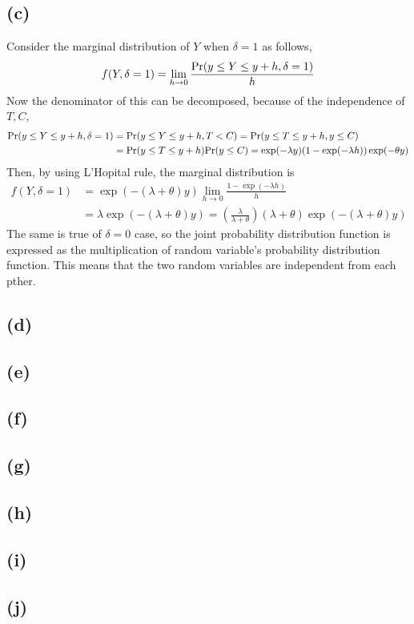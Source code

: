 \documentclass{article}
\begin{document}
\subsection{(c)}
Consider the marginal distribution of $Y$ when $\delta = 1$ as follows,
\begin{align*}
	f(Y, \delta = 1) = \lim_{h \to 0} \frac{{\rm Pr}(y \leq Y \leq y + h, \delta = 1)}{h}
\end{align*}
Now the denominator of this can be decomposed, because of the independence of $T, C$, 
\begin{align*}
	{\rm Pr}(y \leq Y \leq y + h, \delta = 1) &= {\rm Pr}(y \leq Y \leq y + h, T < C) = {\rm Pr}(y \leq T \leq y + h, y \leq C) \\
	&= {\rm Pr}(y \leq T \leq y + h) {\rm Pr}(y \leq C) = \exp(-\lambda y) (1 - \exp(-\lambda h)) \exp(-\theta y) \\
\end{align*}
Then, by using L'Hopital rule, the marginal distribution is 
\begin{align*}
	f(Y, \delta = 1) &= \exp(-(\lambda+\theta)y) \lim_{h \to 0} \frac{1 - \exp(-\lambda h)}{h}\\
	&= \lambda \exp(-(\lambda+\theta)y) = \left(\frac{\lambda}{\lambda+ \theta}\right) (\lambda+\theta)\exp(-(\lambda+\theta)y)
\end{align*}
The same is true of $\delta = 0$ case, so the joint probability distribution function is expressed as the multiplication of random variable's probability distribution function. This means that the two random variables are independent from each pther.

\subsection{(d)}


\subsection{(e)}
\subsection{(f)}
\subsection{(g)}
\subsection{(h)}
\subsection{(i)}
\subsection{(j)}
\end{document}
